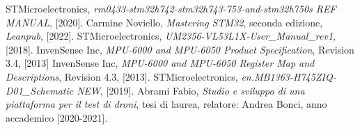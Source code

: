 \documentclass[11pt]{report}
\begin{document}
    \tableofcontents
    \newpage
    
    \pagestyle{plain}



 
 
 
 
 

 \begin{thebibliography}{9}
     STMicroelectronics, \emph{rm0433-stm32h742-stm32h743-753-and-stm32h750s REF MANUAL}, [2020].
     Carmine Noviello, \emph{Mastering STM32}, seconda edizione, \emph{Leanpub}, [2022].
     STMicroelectronics, \emph{UM2356-VL53L1X-User\_Manual\_rev1}, [2018].
     InvenSense Inc, \emph{MPU-6000 and MPU-6050 Product Specification}, Revision 3.4, [2013]
     InvenSense Inc, \emph{MPU-6000 and MPU-6050 Register Map and Descriptions}, Revision 4.3, [2013].
     STMicroelectronics, \emph{en.MB1363-H745ZIQ-D01\_Schematic NEW}, [2019].
     Abrami Fabio, \emph{Studio e sviluppo di una piattaforma per il test di droni}, tesi di laurea, relatore: Andrea Bonci, anno accademico [2020-2021].

\end{thebibliography}
\end{document}
